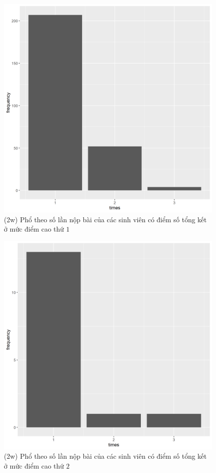 \documentclass[a4paper]{article}
\theoremstyle{definition}
\begin{document}
\newpage
\begin{figure}[!ht]
    \centering
    \includegraphics[scale=0.4]{Pics/q2w-1-file2.png}
    \caption{(2w) Phổ theo số lần nộp bài của các sinh viên có điểm số tổng kết ở mức điểm cao thứ $1$}
    \label{fig:my_label}
\end{figure}
\begin{figure}[!ht]
    \centering
    \includegraphics[scale=0.4]{Pics/q2w-2-file2.png}
    \caption{(2w) Phổ theo số lần nộp bài của các sinh viên có điểm số tổng kết ở mức điểm cao thứ $2$}
    \label{fig:my_label}
\end{figure}
\end{document}
